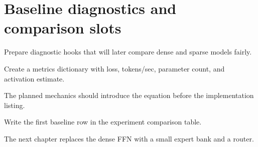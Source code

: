 \section{Baseline diagnostics and comparison slots}
\label{sec:ch02-baseline-diagnostics-and-comparison-slots}

Prepare diagnostic hooks that will later compare dense and sparse models fairly.



Create a metrics dictionary with loss, tokens/sec, parameter count, and activation estimate.



The planned mechanics should introduce the equation before the implementation listing.





\begin{checkpointbox}
Write the first baseline row in the experiment comparison table.
\end{checkpointbox}

The next chapter replaces the dense FFN with a small expert bank and a router.

